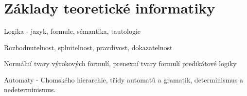 \section{Základy teoretické informatiky}
\begin{pozadavky}
\begin{pitemize}
\item Logika - jazyk, formule, sémantika, tautologie
\item Rozhodnutelnost, splnitelnost, pravdivost, dokazatelnost
\item Normální tvary výrokových formulí, prenexní tvary formulí predikátové logiky
\item Automaty - Chomského hierarchie, třídy automatů a gramatik, determinismus a nedeterminismus.
\end{pitemize}
\end{pozadavky}





